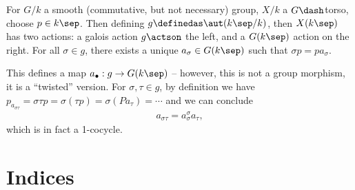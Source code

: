 For \(G/k\) a smooth (commutative, but not necessary) group, \(X/k\) a
\(G\dash\)torso, choose \(p\in k\sep\). Then defining
\(g\definedas \aut(k\sep / k)\), then \(X(k\sep)\) has two actions: a
galois action \(g\actson\) the left, and a \(G(k\sep)\) action on the
right. For all \(\sigma \in g\), there exists a unique
\(a_\sigma \in G(k\sep)\) such that \(\sigma p = p a_{\sigma}\).

This defines a map \(a_\bullet: g\to G(k\sep)\) -- however, this is not
a group morphism, it is a ``twisted'' version. For
\(\sigma, \tau \in g\), by definition we have
\(p_{a_{\sigma \tau}} = \sigma \tau p = \sigma(\tau p) = \sigma (P a_\tau) = \cdots\)
and we can conclude
\begin{align*} a_{\sigma \tau} = a_\sigma^\sigma a_\tau, \end{align*}
which is in fact a 1-cocycle.

\newpage

\newpage
\section{Indices}

\renewcommand{\listtheoremname}{Definitions}
\listoftheorems[ignoreall,show={definition}, numwidth=3.5em]

\renewcommand{\listtheoremname}{Theorems}
\listoftheorems[ignoreall,show={theorem,proposition}, numwidth=3.5em]

\renewcommand{\listtheoremname}{Exercises}
\listoftheorems[ignoreall,show={exercise}, numwidth=3.5em]

\listoffigures


\printbibliography[title=Bibliography]




